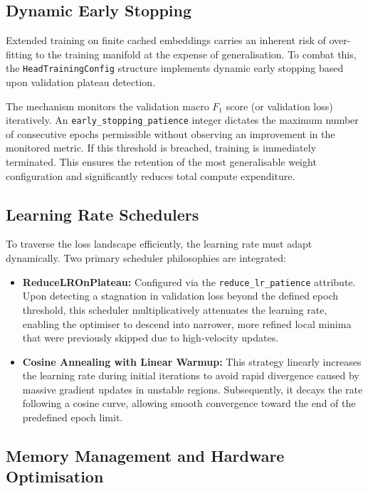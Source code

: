 \subsection{Dynamic Early Stopping}

Extended training on finite cached embeddings carries an inherent risk of over-fitting to the training manifold at the expense of generalisation. To combat this, the \texttt{HeadTrainingConfig} structure implements dynamic early stopping based upon validation plateau detection.

The mechanism monitors the validation macro $F_1$ score (or validation loss) iteratively. An \texttt{early\_stopping\_patience} integer dictates the maximum number of consecutive epochs permissible without observing an improvement in the monitored metric. If this threshold is breached, training is immediately terminated. This ensures the retention of the most generalisable weight configuration and significantly reduces total compute expenditure.

\subsection{Learning Rate Schedulers}

To traverse the loss landscape efficiently, the learning rate must adapt dynamically. Two primary scheduler philosophies are integrated:

\begin{itemize}
    \item \textbf{ReduceLROnPlateau:} Configured via the \texttt{reduce\_lr\_patience} attribute. Upon detecting a stagnation in validation loss beyond the defined epoch threshold, this scheduler multiplicatively attenuates the learning rate, enabling the optimiser to descend into narrower, more refined local minima that were previously skipped due to high-velocity updates.
    \item \textbf{Cosine Annealing with Linear Warmup:} This strategy linearly increases the learning rate during initial iterations to avoid rapid divergence caused by massive gradient updates in unstable regions. Subsequently, it decays the rate following a cosine curve, allowing smooth convergence toward the end of the predefined epoch limit.
\end{itemize}

\subsection{Memory Management and Hardware Optimisation}

